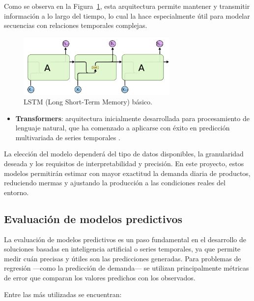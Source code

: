 Como se observa en la Figura~\ref{fig:lstm}, esta arquitectura permite mantener y transmitir información a lo largo del tiempo, lo cual la hace especialmente útil para modelar secuencias con relaciones temporales complejas.

\begin{figure}[t]
    \centering
    \includegraphics[width=0.7\textwidth]{images/lstm.png}
    \caption{LSTM (Long Short-Term Memory) básico.}
    \label{fig:lstm}
\end{figure}

\begin{itemize}
    \item \textbf{Transformers}: arquitectura inicialmente desarrollada para procesamiento de lenguaje natural, que ha comenzado a aplicarse con éxito en predicción multivariada de series temporales \parencite{li2019}.
\end{itemize}

La elección del modelo dependerá del tipo de datos disponibles, la granularidad deseada y los requisitos de interpretabilidad y precisión. En este proyecto, estos modelos permitirán estimar con mayor exactitud la demanda diaria de productos, reduciendo mermas y ajustando la producción a las condiciones reales del entorno.

\subsection{Evaluación de modelos predictivos}

La evaluación de modelos predictivos es un paso fundamental en el desarrollo de soluciones basadas en inteligencia artificial o series temporales, ya que permite medir cuán precisas y útiles son las predicciones generadas. Para problemas de regresión —como la predicción de demanda— se utilizan principalmente métricas de error que comparan los valores predichos con los observados.

Entre las más utilizadas se encuentran:

